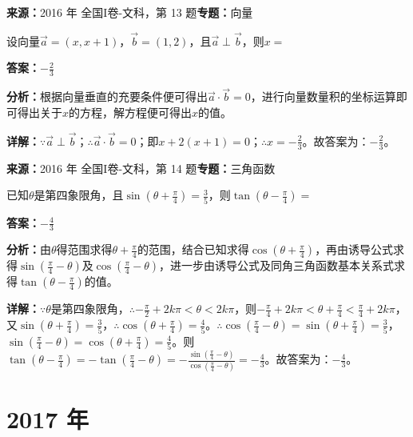 \begin{question}[points=5]
\textbf{来源：}2016 年 全国I卷-文科，第 13 题\quad \textbf{专题：}向量\par
设向量$\vec{a}=(x,x+1)$，$\vec{b}=(1,2)$，且$\vec{a}\perp\vec{b}$，则$x=$
\fillin[{$-\frac{2}{3}$}]
\begin{solution}
\textbf{答案：}$-\frac{2}{3}$

\textbf{分析：}根据向量垂直的充要条件便可得出$\vec{a}\cdot\vec{b}=0$，进行向量数量积的坐标运算即可得出关于$x$的方程，解方程便可得出$x$的值。

\textbf{详解：}$\because \vec{a}\perp\vec{b}$；$\therefore \vec{a}\cdot\vec{b}=0$；即$x+2(x+1)=0$；$\therefore x=-\frac{2}{3}$。故答案为：$-\frac{2}{3}$。
\end{solution}
\end{question}

\begin{question}[points=5]
\textbf{来源：}2016 年 全国I卷-文科，第 14 题\quad \textbf{专题：}三角函数\par
已知$\theta$是第四象限角，且$\sin(\theta+\frac{\pi}{4})=\frac{3}{5}$，则$\tan(\theta-\frac{\pi}{4})=$
\fillin[{$-\frac{4}{3}$}]
\begin{solution}
\textbf{答案：}$-\frac{4}{3}$

\textbf{分析：}由$\theta$得范围求得$\theta+\frac{\pi}{4}$的范围，结合已知求得$\cos(\theta+\frac{\pi}{4})$，再由诱导公式求得$\sin(\frac{\pi}{4}-\theta)$及$\cos(\frac{\pi}{4}-\theta)$，进一步由诱导公式及同角三角函数基本关系式求得$\tan(\theta-\frac{\pi}{4})$的值。

\textbf{详解：}$\because\theta$是第四象限角，$\therefore -\frac{\pi}{2}+2k\pi<\theta<2k\pi$，则$-\frac{\pi}{4}+2k\pi<\theta+\frac{\pi}{4}<\frac{\pi}{4}+2k\pi$，又$\sin(\theta+\frac{\pi}{4})=\frac{3}{5}$，$\therefore\cos(\theta+\frac{\pi}{4})=\frac{4}{5}$。$\therefore\cos(\frac{\pi}{4}-\theta)=\sin(\theta+\frac{\pi}{4})=\frac{3}{5}$，$\sin(\frac{\pi}{4}-\theta)=\cos(\theta+\frac{\pi}{4})=\frac{4}{5}$。则$\tan(\theta-\frac{\pi}{4})=-\tan(\frac{\pi}{4}-\theta)=-\frac{\sin(\frac{\pi}{4}-\theta)}{\cos(\frac{\pi}{4}-\theta)}=-\frac{4}{3}$。故答案为：$-\frac{4}{3}$。
\end{solution}
\end{question}

\section*{2017 年}

